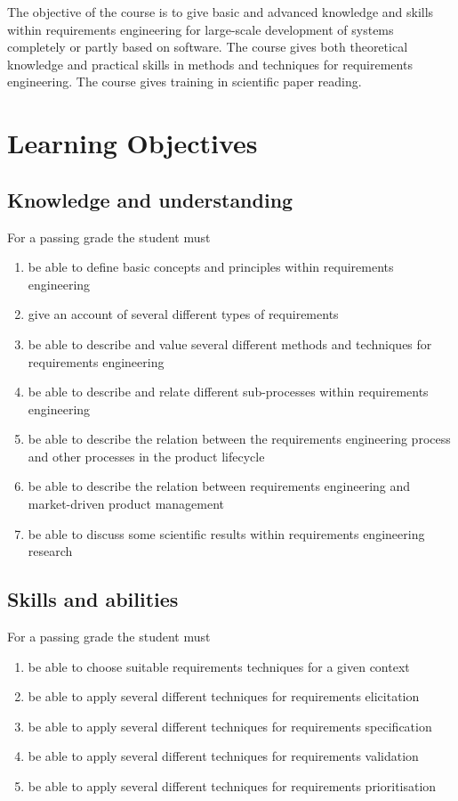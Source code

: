 \documentclass[10pt,a4paper]{article}
\title{\bf\sffamily\fontsize{18}{18}\selectfont{
Course Program\\ ETS170 Requirements Engineering\\http://cs.lth.se/ets170 
}}
\author{\bf\sffamily\fontsize{12}{12}\selectfont{Björn Regnell, Elizabeth Bjarnason}}
\date{\bf\sffamily\fontsize{10}{10}\selectfont{Study period: 20154HT2, Revision date: \today}}
\begin{document}
\maketitle
\noindent 
The objective of the course is to give basic and advanced knowledge and skills within requirements engineering for large-scale development of systems completely or partly based on software. The course gives both theoretical knowledge and practical skills in methods and techniques for requirements engineering. The course gives training in scientific paper reading.

\section{Learning Objectives}
\subsection{Knowledge and understanding}
For a passing grade the student must
\begin{enumerate}[noitemsep]
\item be able to define basic concepts and principles within requirements engineering 
\item give an account of several different types of requirements
\item be able to describe and value several different methods and techniques for requirements engineering
\item be able to describe and relate different sub-processes within requirements engineering
\item be able to describe the relation between the requirements engineering process and other processes in the product lifecycle
\item be able to describe the relation between requirements engineering and market-driven product management
\item be able to discuss some scientific results within requirements engineering research
\end{enumerate}


\subsection{Skills and abilities}
For a passing grade the student must
\begin{enumerate}[noitemsep]
\item be able to choose suitable requirements techniques for a given context
\item     be able to apply several different techniques for requirements elicitation
\item     be able to apply several different techniques for requirements specification
\item     be able to apply several different techniques for requirements validation
\item     be able to apply several different techniques for requirements prioritisation
\end{enumerate}
\end{document}
